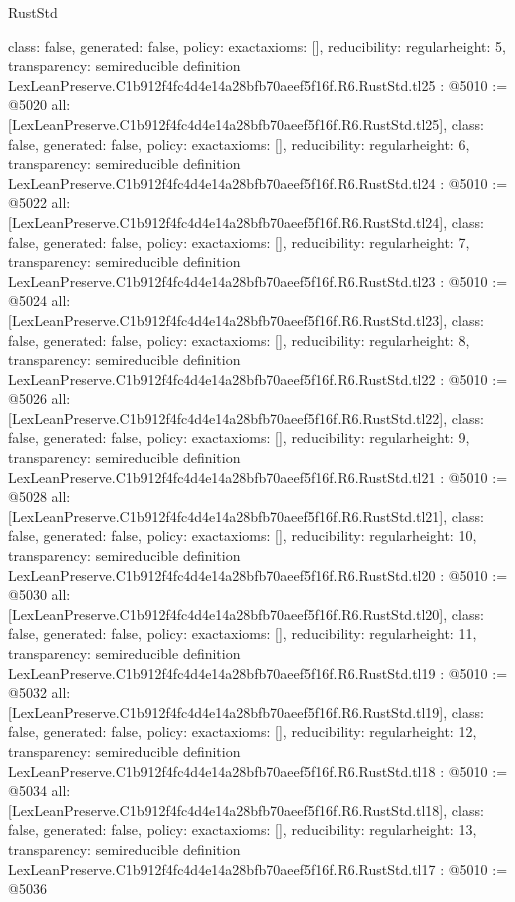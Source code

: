 \begin{lexlean}{RustStd}
\begin{coremodule}
{  class: false,
  generated: false,
  policy: exact{axioms: []},
  reducibility: regular{height: 5},
  transparency: semireducible
}
definition LexLeanPreserve.C1b912f4fc4d4e14a28bfb70aeef5f16f.R6.RustStd.tl25 : @5010 := @5020 {
  all: [LexLeanPreserve.C1b912f4fc4d4e14a28bfb70aeef5f16f.R6.RustStd.tl25],
  class: false,
  generated: false,
  policy: exact{axioms: []},
  reducibility: regular{height: 6},
  transparency: semireducible
}
definition LexLeanPreserve.C1b912f4fc4d4e14a28bfb70aeef5f16f.R6.RustStd.tl24 : @5010 := @5022 {
  all: [LexLeanPreserve.C1b912f4fc4d4e14a28bfb70aeef5f16f.R6.RustStd.tl24],
  class: false,
  generated: false,
  policy: exact{axioms: []},
  reducibility: regular{height: 7},
  transparency: semireducible
}
definition LexLeanPreserve.C1b912f4fc4d4e14a28bfb70aeef5f16f.R6.RustStd.tl23 : @5010 := @5024 {
  all: [LexLeanPreserve.C1b912f4fc4d4e14a28bfb70aeef5f16f.R6.RustStd.tl23],
  class: false,
  generated: false,
  policy: exact{axioms: []},
  reducibility: regular{height: 8},
  transparency: semireducible
}
definition LexLeanPreserve.C1b912f4fc4d4e14a28bfb70aeef5f16f.R6.RustStd.tl22 : @5010 := @5026 {
  all: [LexLeanPreserve.C1b912f4fc4d4e14a28bfb70aeef5f16f.R6.RustStd.tl22],
  class: false,
  generated: false,
  policy: exact{axioms: []},
  reducibility: regular{height: 9},
  transparency: semireducible
}
definition LexLeanPreserve.C1b912f4fc4d4e14a28bfb70aeef5f16f.R6.RustStd.tl21 : @5010 := @5028 {
  all: [LexLeanPreserve.C1b912f4fc4d4e14a28bfb70aeef5f16f.R6.RustStd.tl21],
  class: false,
  generated: false,
  policy: exact{axioms: []},
  reducibility: regular{height: 10},
  transparency: semireducible
}
definition LexLeanPreserve.C1b912f4fc4d4e14a28bfb70aeef5f16f.R6.RustStd.tl20 : @5010 := @5030 {
  all: [LexLeanPreserve.C1b912f4fc4d4e14a28bfb70aeef5f16f.R6.RustStd.tl20],
  class: false,
  generated: false,
  policy: exact{axioms: []},
  reducibility: regular{height: 11},
  transparency: semireducible
}
definition LexLeanPreserve.C1b912f4fc4d4e14a28bfb70aeef5f16f.R6.RustStd.tl19 : @5010 := @5032 {
  all: [LexLeanPreserve.C1b912f4fc4d4e14a28bfb70aeef5f16f.R6.RustStd.tl19],
  class: false,
  generated: false,
  policy: exact{axioms: []},
  reducibility: regular{height: 12},
  transparency: semireducible
}
definition LexLeanPreserve.C1b912f4fc4d4e14a28bfb70aeef5f16f.R6.RustStd.tl18 : @5010 := @5034 {
  all: [LexLeanPreserve.C1b912f4fc4d4e14a28bfb70aeef5f16f.R6.RustStd.tl18],
  class: false,
  generated: false,
  policy: exact{axioms: []},
  reducibility: regular{height: 13},
  transparency: semireducible
}
definition LexLeanPreserve.C1b912f4fc4d4e14a28bfb70aeef5f16f.R6.RustStd.tl17 : @5010 := @5036 {
}
\end{coremodule}
\end{lexlean}
